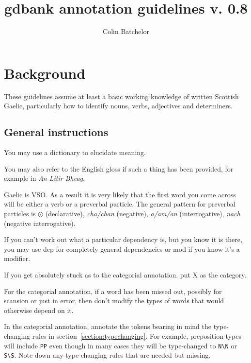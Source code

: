 \documentclass[a4paper]{article}
\begin{document}
\title{gdbank annotation guidelines v. 0.8}
\author{Colin Batchelor}
\maketitle

\tableofcontents

\section{Background}

These guidelines assume at least a basic working knowledge of written Scottish Gaelic, particularly how to identify nouns, verbs, adjectives and determiners.

\subsection{General instructions}

 You may use a dictionary to elucidate meaning.

 You may also refer to the English gloss if such a thing has been provided, for example in {\it An Litir Bheag}.

 Gaelic is VSO. As a result it is very likely that the first word you come across will be either a verb or a preverbal particle.
The general pattern for preverbal particles is $\oslash$ (declarative), \textit{cha/chan} (negative), \textit{a/am/an} (interrogative), \textit{nach} (negative interrogative).

 If you can't work out what a particular dependency is, but you know it is there, you may use dep for completely general dependencies or mod if you know it's a modifier.

 If you get absolutely stuck as to the categorial annotation, put X as the category.

 For the categorial annotation, if a word has been missed out, possibly for scansion or just in error, then don't modify the types of words that would otherwise depend on it.

 In the categorial annotation, annotate the tokens bearing in mind the type-changing rules in section~\ref{section:typechanging}. For example, preposition types will include \texttt{PP} even though in many cases they will be type-changed to \texttt{N\textbackslash N} or \texttt{S\textbackslash S}. Note down any type-changing rules that are needed but missing.
\end{document}

